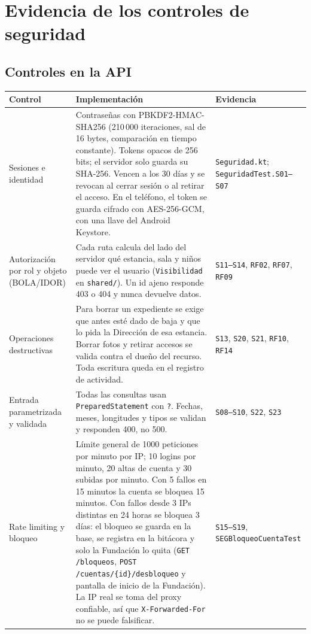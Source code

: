 \section{Evidencia de los controles de seguridad}

\subsection{Controles en la API}
\begin{longtable}{p{3.2cm}p{7.6cm}p{4.2cm}}
\toprule
\textbf{Control} & \textbf{Implementación} & \textbf{Evidencia}\\\midrule\endhead
Sesiones e identidad & Contraseñas con PBKDF2-HMAC-SHA256 (210\,000 iteraciones, sal de 16 bytes, comparación en tiempo constante). Tokens opacos de 256 bits; el servidor solo guarda su SHA-256. Vencen a los 30 días y se revocan al cerrar sesión o al retirar el acceso. En el teléfono, el token se guarda cifrado con AES-256-GCM, con una llave del Android Keystore. & \texttt{Seguridad.\allowbreak{}kt}; \texttt{Seguridad\allowbreak{}Test.\allowbreak{}S01--S07}\\
Autorización por rol y objeto (BOLA/IDOR) & Cada ruta calcula del lado del servidor qué estancia, sala y niños puede ver el usuario (\texttt{Visibilidad} en \texttt{shared/\allowbreak{}}). Un id ajeno responde 403 o 404 y nunca devuelve datos. & \texttt{S11--S14}, \texttt{RF02}, \texttt{RF07}, \texttt{RF09}\\
Operaciones destructivas & Para borrar un expediente se exige que antes esté dado de baja y que lo pida la Dirección de esa estancia. Borrar fotos y retirar accesos se valida contra el dueño del recurso. Toda escritura queda en el registro de actividad. & \texttt{S13}, \texttt{S20}, \texttt{S21}, \texttt{RF10}, \texttt{RF14}\\
Entrada parametrizada y validada & Todas las consultas usan \texttt{Prepared\allowbreak{}Statement} con \texttt{?}. Fechas, meses, longitudes y tipos se validan y responden 400, no 500. & \texttt{S08--S10}, \texttt{S22}, \texttt{S23}\\
Rate limiting y bloqueo & Límite general de 1000 peticiones por minuto por IP; 10 logins por minuto, 20 altas de cuenta y 30 subidas por minuto. Con 5 fallos en 15 minutos la cuenta se bloquea 15 minutos. Con fallos desde 3 IPs distintas en 24 horas se bloquea 3 días: el bloqueo se guarda en la base, se registra en la bitácora y solo la Fundación lo quita (\texttt{GET /\allowbreak{}bloqueos}, \texttt{POST /cuentas/\{id\}/desbloqueo} y pantalla de inicio de la Fundación). La IP real se toma del proxy confiable, así que \texttt{X-Forwarded-For} no se puede falsificar. & \texttt{S15--S19}, \texttt{SEGBloqueo\allowbreak{}Cuenta\allowbreak{}Test}\\

\end{longtable}
